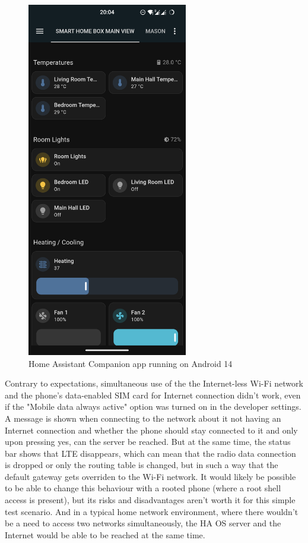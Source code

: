 \begin{figure}[!ht]
  \centering
  \includegraphics[width=70mm, keepaspectratio]{figures/homeassistant_android_screenshot.png}
  \caption{Home Assistant Companion app running on Android 14}
  \label{fig:HAandroidScreenshot}
\end{figure}

Contrary to expectations, simultaneous use of the the Internet-less Wi-Fi network and the phone's data-enabled SIM card for Internet connection didn't work, even if the "Mobile data always active" option was turned on in the developer settings. A message is shown when connecting to the network about it not having an Internet connection and whether the phone should stay connected to it and only upon pressing yes, can the server be reached. But at the same time, the status bar shows that LTE disappears, which can mean that the radio data connection is dropped or only the routing table is changed, but in such a way that the default gateway gets overriden to the Wi-Fi network. It would likely be possible to be able to change this behaviour with a rooted phone (where a root shell access is present), but its risks and disadvantages aren't worth it for this simple test scenario. And in a typical home network environment, where there wouldn't be a need to access two networks simultaneously, the HA OS server and the Internet would be able to be reached at the same time.

